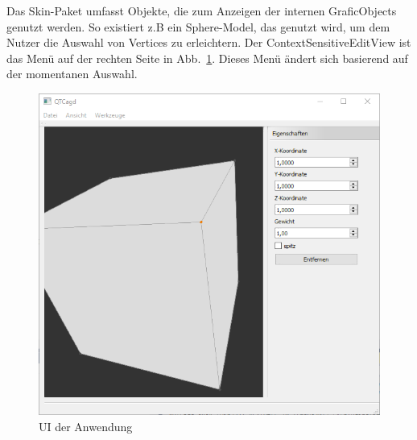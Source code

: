 Das Skin-Paket umfasst Objekte, die zum Anzeigen der internen GraficObjects genutzt werden. 
So existiert z.B ein Sphere-Model, das genutzt wird, um dem Nutzer die Auswahl von Vertices zu erleichtern. 
Der ContextSensitiveEditView ist das Menü auf der rechten Seite in Abb.~\ref{fig:ui}. Dieses Menü ändert sich basierend auf der momentanen Auswahl.

\begin{figure}[htbp]
\centering
\includegraphics[scale=0.7]{content/pictures/cadgWindow.PNG}
\caption{UI der Anwendung}
\label{fig:ui}
\end{figure}